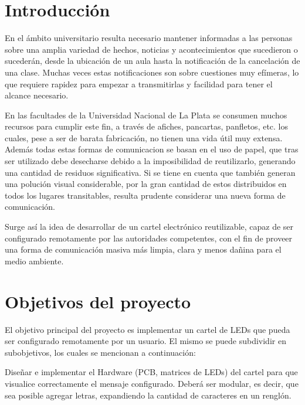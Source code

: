 \section{Introducción}
En el ámbito universitario resulta necesario mantener informadas a las personas sobre una amplia variedad de hechos, noticias y acontecimientos que sucedieron o sucederán, desde la ubicación de un aula hasta la notificación de la cancelación de una clase. Muchas veces estas notificaciones son sobre cuestiones muy efímeras, lo que requiere rapidez para empezar a transmitirlas y facilidad para tener el alcance necesario.

En las facultades de la Universidad Nacional de La Plata se consumen muchos recursos para cumplir este fin, a través de afiches, pancartas, panfletos, etc. los cuales, pese a ser de barata fabricación, no tienen una vida útil muy extensa. Además todas estas formas de comunicacion se basan en el uso de papel, que tras ser utilizado debe desecharse debido a la imposibilidad de reutilizarlo, generando una cantidad de residuos significativa. Si se tiene en cuenta que también generan una polución visual considerable, por la gran cantidad de estos distribuidos en todos los lugares transitables, resulta prudente considerar una nueva forma de comunicación.

Surge así la idea de desarrollar de un cartel electrónico reutilizable, capaz de ser configurado remotamente por las autoridades competentes, con el fin de proveer una forma de comunicación masiva más limpia, clara y menos dañina para el medio ambiente. 

\section{Objetivos del proyecto}
El objetivo principal del proyecto es implementar un cartel de LEDs que pueda ser configurado remotamente por un usuario.
El mismo se puede subdividir en subobjetivos, los cuales se mencionan a continuación:

Diseñar e implementar el Hardware (PCB, matrices de LEDs) del cartel para que visualice correctamente el mensaje configurado. Deberá ser modular, es decir, que sea posible agregar letras, expandiendo la cantidad de caracteres en un renglón.

